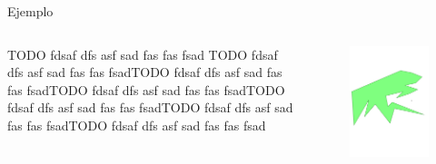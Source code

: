 \documentclass[aspectratio=169,xcolor=dvipsnames, t]{beamer}
\begin{document}
\begin{frame}{Ejemplo}
  \begin{columns}
    \begin{column}{0.3\textwidth}
      \raggedright %
      TODO fdsaf  dfs asf sad fas fas fsad TODO fdsaf  dfs asf sad fas fas fsadTODO fdsaf  dfs asf sad fas fas fsadTODO fdsaf  dfs asf sad fas fas fsadTODO fdsaf  dfs asf sad fas fas fsadTODO fdsaf  dfs asf sad fas fas fsadTODO fdsaf  dfs asf sad fas fas fsad
    \end{column}
    \begin{column}{0.7\textwidth}
      \vspace{-2.5cm} %
      \begin{figure}
        \centering
        \includegraphics[width=1\linewidth, height=.95\textheight, page=24, keepaspectratio]{IPE/point_visibility.pdf}
      \end{figure}
    \end{column}
  \end{columns}
\end{frame}
\end{document}
